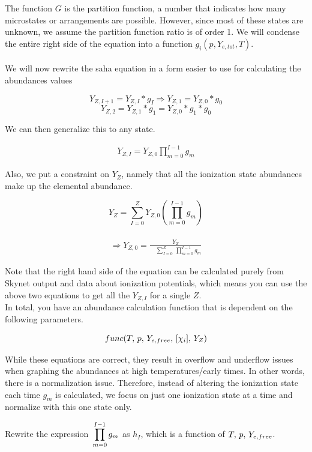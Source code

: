 \documentclass[11pt,a4paper]{article}
\begin{document}
The function $G$ is the partition function, a number that indicates how many microstates or arrangements are possible. However, since most of these states are unknown, we assume the partition function ratio is of order 1. We will condense the entire right side of the equation into a function $g_i (p,Y_{e,tot},T) $.
\\\\
We will now rewrite the saha equation in a form easier to use for calculating the abundances values

$$ Y_{Z,I+1} = Y_{Z,I} * g_I \Longrightarrow  Y_{Z,1} = Y_{Z,0}*g_0 $$   $$ Y_{Z,2} = Y_{Z,1}*g_1 = Y_{Z,0}*g_1 * g_0 $$

We can then generalize this to any state. 

\begin{align} 
Y_{Z,I} = Y_{Z,0} \prod_{m=0}^{I - 1} g_m 
\end{align}

Also, we put a constraint on $Y_Z$, namely that all the ionization state abundances make up the elemental abundance.  

$$ Y_Z = \sum_{I=0}^{Z} Y_{Z,0} \left(\prod_{m=0}^{I - 1} g_m\right) $$\\
\begin{align} 
\Longrightarrow Y_{Z,0} = \frac{Y_Z}{\quad \displaystyle \sum_{I=0}^{Z} \medspace \prod_{m=0}^{I - 1} g_m}
\end{align}

Note that the right hand side of the equation can be calculated purely from Skynet output and data about ionization potentials, which means you can use the above two equations to get all the $Y_{Z,I}$ for a single $Z$. 
\\
In total, you have an abundance calculation function that is dependent on the following parameters. 

$$func(T,\thinspace p,\thinspace Y_{e,free},\thinspace [\chi_i],\thinspace Y_Z)$$

While these equations are correct, they result in overflow and underflow issues when graphing the abundances at high temperatures/early times. In other words, there is a normalization issue. Therefore, instead of altering the ionization state each time $g_m$ is calculated, we focus on just one ionization state at a time and normalize with this one state only. 

Rewrite the expression  $\thinspace \displaystyle \prod_{m=0}^{I - 1} g_m$ as $h_I$, which is a function of $T,\thinspace p,\thinspace Y_{e,free}$. \\
\end{document}
